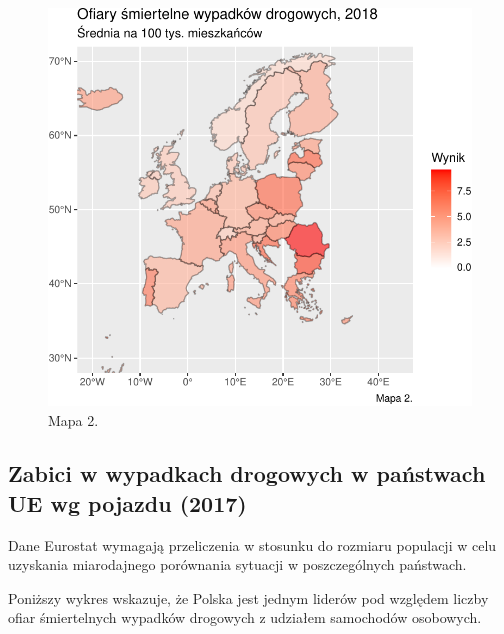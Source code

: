 \documentclass[
]{article}
\begin{document}
\begin{figure}

\includegraphics{raport_wypadki_files/figure-latex/unnamed-chunk-6-1} \hfill{}

\caption{Mapa 2.}\label{fig:unnamed-chunk-6}
\end{figure}

\hypertarget{zabici-w-wypadkach-drogowych-w-paux144stwach-ue-wg-pojazdu-2017}{%
\subsection{Zabici w wypadkach drogowych w państwach UE wg pojazdu
(2017)}\label{zabici-w-wypadkach-drogowych-w-paux144stwach-ue-wg-pojazdu-2017}}

Dane Eurostat wymagają przeliczenia w stosunku do rozmiaru populacji w
celu uzyskania miarodajnego porównania sytuacji w poszczególnych
państwach.

Poniższy wykres wskazuje, że Polska jest jednym liderów pod względem
liczby ofiar śmiertelnych wypadków drogowych z udziałem samochodów
osobowych.
\end{document}
